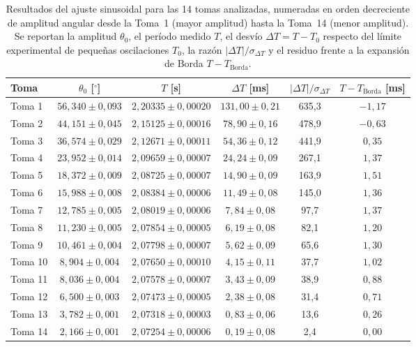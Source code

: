 \begin{table}[htbp]
\centering
\caption{Resultados del ajuste sinusoidal para las 14 tomas analizadas, numeradas en orden decreciente de amplitud angular desde la Toma~1 (mayor amplitud) hasta la Toma~14 (menor amplitud). Se reportan la amplitud $\theta_0$, el período medido $T$, el desvío $\Delta T = T - T_0$ respecto del límite experimental de pequeñas oscilaciones $T_0$, la razón $|\Delta T|/\sigma_{\Delta T}$ y el residuo frente a la expansión de Borda $T - T_{\text{Borda}}$.}
\label{tab:resumen_pendulo}
\small
\begin{tabular}{lccccc}
\toprule
Toma & $\theta_0$ [$^\circ$] & $T$ [s] & $\Delta T$ [ms] & $|\Delta T|/\sigma_{\Delta T}$ & $T - T_{\text{Borda}}$ [ms] \\
\midrule
Toma 1 & $56{,}340 \pm 0{,}093$ & $2{,}20335 \pm 0{,}00020$ & $131{,}00 \pm 0{,}21$ & 635,3 & $-1{,}17$ \\
Toma 2 & $44{,}151 \pm 0{,}045$ & $2{,}15125 \pm 0{,}00016$ & $78{,}90 \pm 0{,}16$ & 478,9 & $-0{,}63$ \\
Toma 3 & $36{,}574 \pm 0{,}029$ & $2{,}12671 \pm 0{,}00011$ & $54{,}36 \pm 0{,}12$ & 441,9 & $0{,}35$ \\
Toma 4 & $23{,}952 \pm 0{,}014$ & $2{,}09659 \pm 0{,}00007$ & $24{,}24 \pm 0{,}09$ & 267,1 & $1{,}37$ \\
Toma 5 & $18{,}372 \pm 0{,}009$ & $2{,}08725 \pm 0{,}00007$ & $14{,}90 \pm 0{,}09$ & 163,9 & $1{,}51$ \\
Toma 6 & $15{,}988 \pm 0{,}008$ & $2{,}08384 \pm 0{,}00006$ & $11{,}49 \pm 0{,}08$ & 145,0 & $1{,}36$ \\
Toma 7 & $12{,}785 \pm 0{,}005$ & $2{,}08019 \pm 0{,}00006$ & $7{,}84 \pm 0{,}08$ & 97,7 & $1{,}37$ \\
Toma 8 & $11{,}230 \pm 0{,}005$ & $2{,}07854 \pm 0{,}00005$ & $6{,}19 \pm 0{,}08$ & 82,1 & $1{,}20$ \\
Toma 9 & $10{,}461 \pm 0{,}004$ & $2{,}07798 \pm 0{,}00007$ & $5{,}62 \pm 0{,}09$ & 65,6 & $1{,}30$ \\
Toma 10 & $8{,}904 \pm 0{,}004$ & $2{,}07650 \pm 0{,}00010$ & $4{,}15 \pm 0{,}11$ & 37,7 & $1{,}02$ \\
Toma 11 & $8{,}036 \pm 0{,}004$ & $2{,}07578 \pm 0{,}00007$ & $3{,}43 \pm 0{,}09$ & 38,9 & $0{,}88$ \\
Toma 12 & $6{,}500 \pm 0{,}003$ & $2{,}07473 \pm 0{,}00005$ & $2{,}38 \pm 0{,}08$ & 31,4 & $0{,}71$ \\
Toma 13 & $3{,}782 \pm 0{,}001$ & $2{,}07318 \pm 0{,}00003$ & $0{,}83 \pm 0{,}06$ & 13,6 & $0{,}26$ \\
Toma 14 & $2{,}166 \pm 0{,}001$ & $2{,}07254 \pm 0{,}00006$ & $0{,}19 \pm 0{,}08$ & 2,4 & $0{,}00$ \\
\bottomrule
\end{tabular}
\end{table}
